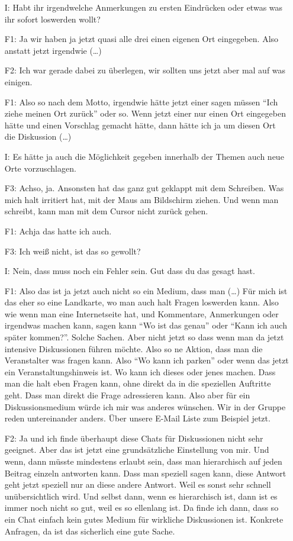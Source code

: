 \begin{itemize}
    \item[I:] Habt ihr irgendwelche Anmerkungen zu ersten Eindrücken oder etwas was ihr sofort loswerden wollt?
    \item[F1:] Ja wir haben ja jetzt quasi alle drei einen eigenen Ort eingegeben. Also anstatt jetzt irgendwie (\dots)
    \item[F2:] Ich war gerade dabei zu überlegen, wir sollten uns jetzt aber mal auf was einigen.
    \item[F1:] Also so nach dem Motto, irgendwie hätte jetzt einer sagen müssen "`Ich ziehe meinen Ort zurück"' oder so. Wenn jetzt einer nur einen Ort eingegeben hätte und einen Vorschlag gemacht hätte, dann hätte ich ja um diesen Ort die Diskussion (\dots)
    \item[I:] Es hätte ja auch die Möglichkeit gegeben innerhalb der Themen auch neue Orte vorzuschlagen.
    \item[F3:] Achso, ja. Ansonsten hat das ganz gut geklappt mit dem Schreiben. Was mich halt irritiert hat, mit der Maus am Bildschirm ziehen. Und wenn man schreibt, kann man mit dem Cursor nicht zurück gehen.
    \item[F1:] Achja das hatte ich auch.
    \item[F3:] Ich weiß nicht, ist das so gewollt?
    \item[I:] Nein, dass muss noch ein Fehler sein. Gut dass du das gesagt hast.
    \item[F1:] Also das ist ja jetzt auch nicht so ein Medium, dass man (\dots) Für mich ist das eher so eine Landkarte, wo man auch halt Fragen loswerden kann. Also wie wenn man eine Internetseite hat, und Kommentare, Anmerkungen oder irgendwas machen kann, sagen kann "`Wo ist das genau"' oder "`Kann ich auch später kommen?"'. Solche Sachen. Aber nicht jetzt so dass wenn man da jetzt intensive Diskussionen führen möchte. Also so ne Aktion, dass man die Veranstalter was fragen kann. Also "`Wo kann ich parken"' oder wenn das jetzt ein Veranstaltungshinweis ist. Wo kann ich dieses oder jenes machen. Dass man die halt eben Fragen kann, ohne direkt da in die speziellen Auftritte geht. Dass man direkt die Frage adressieren kann. Also aber für ein Diskussionsmedium würde ich mir was anderes wünschen. Wir in der Gruppe reden untereinander anders. {\"U}ber unsere E-Mail Liste zum Beispiel jetzt.
    \item[F2:] Ja und ich finde überhaupt diese Chats für Diskussionen nicht sehr geeignet. Aber das ist jetzt eine grundsätzliche Einstellung von mir. Und wenn, dann müsste mindestens erlaubt sein, dass man hierarchisch auf jeden Beitrag einzeln antworten kann. Dass man speziell sagen kann, diese Antwort geht jetzt speziell nur an diese andere Antwort. Weil es sonst sehr schnell unübersichtlich wird. Und selbst dann, wenn es hierarchisch ist, dann ist es immer noch nicht so gut, weil es so ellenlang ist. Da finde ich dann, dass so ein Chat einfach kein gutes Medium für wirkliche Diskussionen ist. Konkrete Anfragen, da ist das sicherlich eine gute Sache.

\end{itemize}
